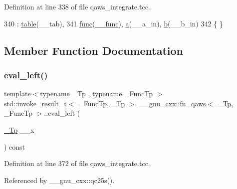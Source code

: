 Definition at line 338 of file qaws\+\_\+integrate.\+tcc.


\begin{DoxyCode}
340       : \hyperlink{struct____gnu__cxx_1_1fn__qaws_a8a96359bac745cd83938fc0735a9168d}{table}(\_\_tab),
341         \hyperlink{struct____gnu__cxx_1_1fn__qaws_a0fe42f7ea452aae136c5dba3264c3e93}{func}(\hyperlink{namespace____gnu__cxx_af2b2f0c7a2ae72b922b1afefae5a65b2}{\_\_func}), \hyperlink{struct____gnu__cxx_1_1fn__qaws_afe83dc1c94299aedf4cb7be0499fe572}{a}(\_\_a\_in), \hyperlink{struct____gnu__cxx_1_1fn__qaws_a35f509512c31f2ee8fddc16405dc6e80}{b}(\_\_b\_in)
342       \{ \}
\end{DoxyCode}


\subsection{Member Function Documentation}
\mbox{\label{struct____gnu__cxx_1_1fn__qaws_afbe290f928e148bc754398a79932386c}} 
\subsubsection{\texorpdfstring{eval\+\_\+left()}{eval\_left()}}
{\footnotesize\ttfamily template$<$typename \+\_\+\+Tp , typename \+\_\+\+Func\+Tp $>$ \\
std\+::invoke\+\_\+result\+\_\+t$<$ \+\_\+\+Func\+Tp, \hyperlink{namespace____gnu__cxx_a3b19a9c800ca194374ef9172290f7d79}{\+\_\+\+Tp} $>$ \hyperlink{struct____gnu__cxx_1_1fn__qaws}{\+\_\+\+\_\+gnu\+\_\+cxx\+::fn\+\_\+qaws}$<$ \hyperlink{namespace____gnu__cxx_a3b19a9c800ca194374ef9172290f7d79}{\+\_\+\+Tp}, \+\_\+\+Func\+Tp $>$\+::eval\+\_\+left (\begin{DoxyParamCaption}\item[{\hyperlink{namespace____gnu__cxx_a3b19a9c800ca194374ef9172290f7d79}{\+\_\+\+Tp}}]{\+\_\+\+\_\+x }\end{DoxyParamCaption}) const}



Definition at line 372 of file qaws\+\_\+integrate.\+tcc.



Referenced by \+\_\+\+\_\+gnu\+\_\+cxx\+::qc25s().


